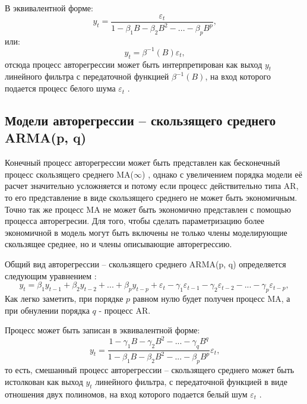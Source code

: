 \documentclass[a4paper,14pt,russian]{extreport}
\begin{document}
В эквивалентной форме:
\begin{equation}
	y_t = \frac{\varepsilon_t}{1 - \beta_1 B - \beta_2 B^2 - ... - \beta_p B^p} \text{,} 
	\nonumber
\end{equation}
или:
\begin{equation}
	y_t = \beta^{-1}(B)\varepsilon_t \text{,}
	\nonumber
\end{equation}
отсюда процесс авторегрессии может быть интерпретирован как выход $y_t$ 
линейного фильтра с передаточной функцией $\beta^{-1}(B)$, на вход которого 
подается процесс белого шума $\varepsilon_t$ \cite{box2008}. 


\subsection{Модели авторегрессии -- скользящего среднего ARMA(p, q)}
Конечный процесс авторегрессии может быть представлен как бесконечный 
процесс скользящего среднего MA($\infty$) \cite{hamilton1994, chatfield2000}, 
однако с увеличением порядка модели её расчет значительно усложняется и 
потому если процесс действительно типа AR, то его представление в виде 
скользящего среднего не может быть экономичным. Точно так же процесс MA не 
может быть экономично представлен с помощью процесса авторегресии. Для 
того, чтобы сделать параметризацию более экономичной в модель могут быть 
включены не только члены моделирующие скользящее среднее, но и члены 
описывающие авторегрессию.

Общий вид авторегрессии -- скользящего среднего ARMA(p, q) определяется 
следующим уравнением \cite{runova2013}:
\begin{equation}
	y_t = \beta_1 y_{t-1} + \beta_2 y_{t-2} + ... + \beta_p y_{t-p} + \varepsilon_t 
		- \gamma_1 \varepsilon_{t-1} - \gamma_2 \varepsilon_{t-2}  - ... 
		- \gamma_p \varepsilon_{t-p}, 
		\nonumber
\end{equation}
Как легко заметить, при порядке $p$ равном нулю будет получен процесс MA, 
а при обнулении порядка $q$ - процесс AR. 

Процесс  может быть записан в эквивалентной форме:
\begin{equation}
	y_t = \frac
		{1 - \gamma_1 B - \gamma_2 B^2 - ... - \gamma_q B^q}
		{1 - \beta_1 B - \beta_2 B^2 - ... - \beta_p B^p}  \varepsilon_t \text{,} 
		\nonumber
\end{equation}
то есть, смешанный процесс авторегрессии -- скользящего среднего 
может быть истолкован как выход $y_t$ линейного фильтра, с передаточной 
функцией в виде отношения двух полиномов, на вход которого подается белый 
шум $\varepsilon_t$ \cite{box2008}. 
 
\end{document}
